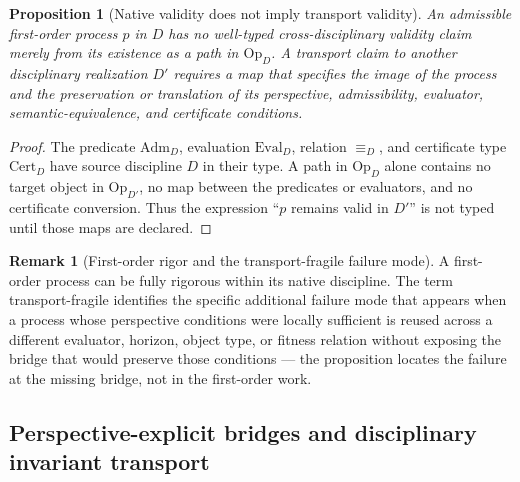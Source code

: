 \documentclass[11pt]{article}
\newtheorem{proposition}{Proposition}
\theoremstyle{definition}
\newtheorem{remark}{Remark}
\begin{document}
\begin{proposition}[Native validity does not imply transport validity]
An admissible first-order process $p$ in $D$ has no well-typed cross-disciplinary validity claim merely from its existence as a path in $\mathrm{Op}_D$. A transport claim to another disciplinary realization $D'$ requires a map that specifies the image of the process and the preservation or translation of its perspective, admissibility, evaluator, semantic-equivalence, and certificate conditions.
\end{proposition}

\begin{proof}
The predicate $\mathrm{Adm}_D$, evaluation $\mathrm{Eval}_D$, relation $\equiv_D$, and certificate type $\mathrm{Cert}_D$ have source discipline $D$ in their type. A path in $\mathrm{Op}_D$ alone contains no target object in $\mathrm{Op}_{D'}$, no map between the predicates or evaluators, and no certificate conversion. Thus the expression ``$p$ remains valid in $D'$'' is not typed until those maps are declared.
\end{proof}

\begin{remark}[First-order rigor and the transport-fragile failure mode]
A first-order process can be fully rigorous within its native discipline. The term transport-fragile identifies the specific additional failure mode that appears when a process whose perspective conditions were locally sufficient is reused across a different evaluator, horizon, object type, or fitness relation without exposing the bridge that would preserve those conditions --- the proposition locates the failure at the missing bridge, not in the first-order work.
\end{remark}

\subsection{Perspective-explicit bridges and disciplinary invariant transport}
\end{document}

